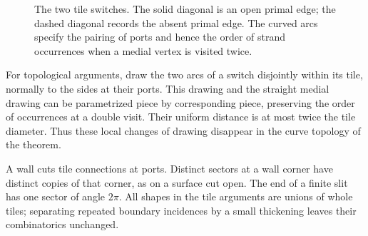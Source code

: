 \begin{figure}[htbp]
\centering
{}
\caption{The two tile switches. The solid diagonal is an open primal
edge; the dashed diagonal records the absent primal edge. The curved
arcs specify the pairing of ports and hence the order of strand
occurrences when a medial vertex is visited twice.}
\label{prelim:switch-figure}
\end{figure}

For topological arguments, draw the two arcs of a switch disjointly within
its tile, normally to the sides at their ports. This drawing and the straight
medial drawing can be parametrized piece by corresponding piece, preserving
the order of occurrences at a double visit. Their uniform distance is at
most twice the tile diameter. Thus these local changes of drawing disappear
in the curve topology of the theorem.

A wall cuts tile connections at ports. Distinct sectors at a wall corner
have distinct copies of that corner, as on a surface cut open. The end of a
finite slit has one sector of angle $2\pi$. All shapes in the tile arguments
are unions of whole tiles; separating repeated boundary incidences by a
small thickening leaves their combinatorics unchanged.

